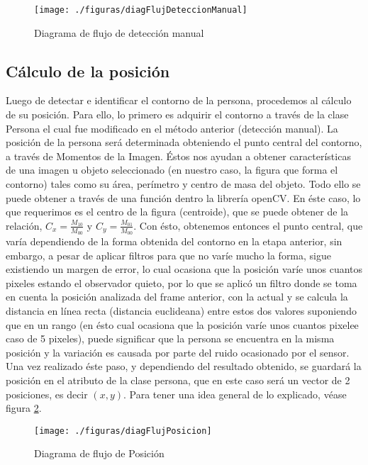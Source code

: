 \documentclass[a4paper,openright,12pt]{report}
\begin{document}
\begin{figure}[ht]
	\centering
	\texttt{[image: ./figuras/diagFlujDeteccionManual]}
	\caption{Diagrama de flujo de detección manual} \label{fig:diagFlujDeteccionManual}
\end{figure}
\subsection{Cálculo de la posición}
Luego de detectar e identificar el contorno de la persona, procedemos al cálculo de su posición. Para ello, lo primero es adquirir el contorno a través de la clase Persona el cual fue modificado en el método anterior (detección manual). La posición de la persona será determinada obteniendo el punto central del contorno, a través de Momentos de la Imagen. Éstos nos ayudan a obtener características de una imagen u objeto seleccionado (en nuestro caso, la figura que forma el contorno) tales como su área, perímetro y centro de masa del objeto. Todo ello se puede obtener a través de una función dentro la librería openCV. En éste caso, lo que requerimos es el centro de la figura (centroide), que se puede obtener de la relación, $C_x = \frac{M_{10}}{M_{00}}$ y $C_y = \frac{M_{01}}{M_{00}}$.  Con ésto, obtenemos entonces el punto central, que varía dependiendo de la forma obtenida del contorno en la etapa anterior, sin embargo, a pesar de aplicar filtros para que no varíe mucho la forma, sigue existiendo un margen de error, lo cual ocasiona que la posición varíe unos cuantos pixeles estando el observador quieto, por lo que se aplicó un filtro donde se toma en cuenta la posición analizada del frame anterior, con la actual y se calcula la distancia en línea recta (distancia euclideana) entre estos dos valores suponiendo que en un rango (en ésto cual ocasiona que la posición varíe unos cuantos pixelee caso de 5 pixeles), puede significar que la persona se encuentra en la misma posición y la variación es causada por parte del ruido ocasionado por el sensor. Una vez realizado éste paso, y dependiendo del resultado obtenido, se guardará la posición en el atributo de la clase persona, que en este caso será un vector de 2 posiciones, es decir $ (x,y) $. Para tener una idea general de lo explicado, véase figura \ref{fig:diagFlujPosicion}.
\begin{figure}[ht]
	\centering
	\texttt{[image: ./figuras/diagFlujPosicion]}
	\caption{Diagrama de flujo de Posición} \label{fig:diagFlujPosicion}
\end{figure}
\end{document}
